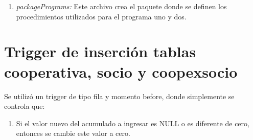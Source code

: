 \documentclass{article}
\begin{document}
    \begin{enumerate}
    \begin{enumerate}[1.6]
        \item \emph{packagePrograms:} Este archivo crea el paquete donde se definen los procedimientos utilizados para el programa uno y dos.
    \end{enumerate}
    \end{enumerate}

\section{Trigger de inserción tablas cooperativa, socio y coopexsocio}\label{sec:trigger-de-insercion-cooperativa-socio-y-coopexsocio}
    Se utilizó un trigger de tipo fila y momento before, donde simplemente se controla que:
    \begin{enumerate}
        \begin{enumerate}[2.1]
            \item Si el valor nuevo del acumulado a ingresar es NULL o es diferente de cero, entonces se cambie este valor a cero.
        \end{enumerate}
    \end{enumerate}
\end{document}
